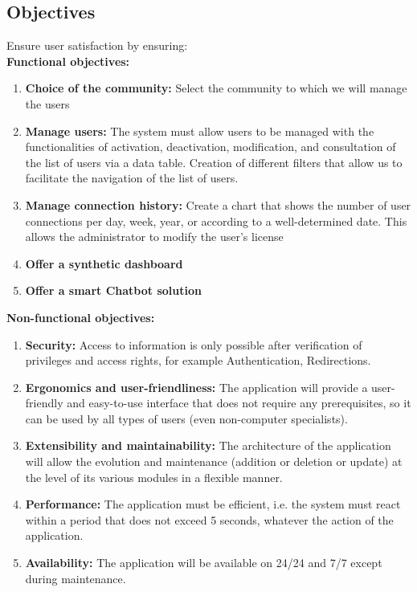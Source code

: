 \subsection{Objectives}
Ensure user satisfaction by ensuring:\\
\textbf{Functional objectives:}
\begin{enumerate}
\item \textbf{Choice of the community:}
Select the community to which we will manage the users

\item \textbf{Manage users:}
The system must allow users to be managed with the functionalities of activation,
deactivation, modification, and consultation of the list of users via a data table.
Creation of different filters that allow us to facilitate the navigation of the list of users.

\item \textbf{Manage connection history:}
Create a chart that shows the number of user connections per day, week, year, or
according to a well-determined date. This allows the administrator to modify the user’s license

\item \textbf{Offer a synthetic dashboard}
\item \textbf{Offer a smart Chatbot solution}

\end{enumerate}
\textbf{Non-functional objectives:}
\begin{enumerate}
\item\textbf{ Security:} Access to information is only possible after verification of privileges and access rights,
for example Authentication, Redirections.

\item \textbf{Ergonomics and user-friendliness:}
The application will provide a user-friendly and easy-to-use interface that does not
require any prerequisites, so it can be used by all types of users (even non-computer specialists).

\item \textbf{Extensibility and maintainability:}
The architecture of the application will allow the evolution and maintenance (addition
or deletion or update) at the level of its various modules in a flexible manner.

\item \textbf{Performance:}
The application must be efficient, i.e. the system must react within a period that does
not exceed 5 seconds, whatever the action of the application.
\item \textbf{Availability:}
The application will be available on 24/24 and 7/7 except during maintenance.

\end{enumerate}

